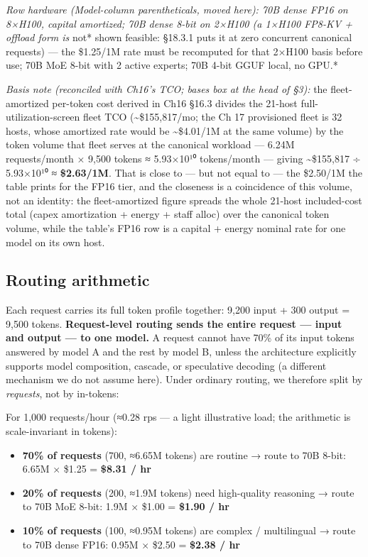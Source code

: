 \emph{Row hardware (Model-column parentheticals, moved here): 70B dense
FP16 on 8×H100, capital amortized; 70B dense 8-bit on 2×H100 (a 1×H100
FP8-KV + offload form is }not* shown feasible: §18.3.1 puts it at zero
concurrent canonical requests) --- the \$1.25/1M rate must be recomputed
for that 2×H100 basis before use; 70B MoE 8-bit with 2 active experts;
70B 4-bit GGUF local, no GPU.*

\emph{Basis note (reconciled with Ch16's TCO; bases box at the head of
§3):} the fleet-amortized per-token cost derived in Ch16 §16.3 divides
the 21-host full-utilization-screen fleet TCO
(\textasciitilde\$155,817/mo; the Ch 17 provisioned fleet is 32 hosts,
whose amortized rate would be \textasciitilde\$4.01/1M at the same
volume) by the token volume that fleet serves at the canonical workload
--- 6.24M requests/month × 9,500 tokens ≈ 5.93×10¹⁰ tokens/month ---
giving \textasciitilde\$155,817 ÷ 5.93×10¹⁰ ≈ \textbf{\$2.63/1M}. That
is close to --- but not equal to --- the \$2.50/1M the table prints for
the FP16 tier, and the closeness is a coincidence of this volume, not an
identity: the fleet-amortized figure spreads the whole 21-host
included-cost total (capex amortization + energy + staff alloc) over the
canonical token volume, while the table's FP16 row is a capital + energy
nominal rate for one model on its own host.

\subsection{Routing arithmetic}\label{routing-arithmetic}

Each request carries its full token profile together: 9,200 input + 300
output = 9,500 tokens. \textbf{Request-level routing sends the entire
request --- input and output --- to one model.} A request cannot have
70\% of its input tokens answered by model A and the rest by model B,
unless the architecture explicitly supports model composition, cascade,
or speculative decoding (a different mechanism we do not assume here).
Under ordinary routing, we therefore split by \emph{requests}, not by
in-tokens:

For 1,000 requests/hour (≈0.28 rps --- a light illustrative load; the
arithmetic is scale-invariant in tokens):

\begin{itemize}
\tightlist
\item
  \textbf{70\% of requests} (700, ≈6.65M tokens) are routine → route to
  70B 8-bit: 6.65M × \$1.25 = \textbf{\$8.31 / hr}
\item
  \textbf{20\% of requests} (200, ≈1.9M tokens) need high-quality
  reasoning → route to 70B MoE 8-bit: 1.9M × \$1.00 = \textbf{\$1.90 /
  hr}
\item
  \textbf{10\% of requests} (100, ≈0.95M tokens) are complex /
  multilingual → route to 70B dense FP16: 0.95M × \$2.50 =
  \textbf{\$2.38 / hr}
\end{itemize}

